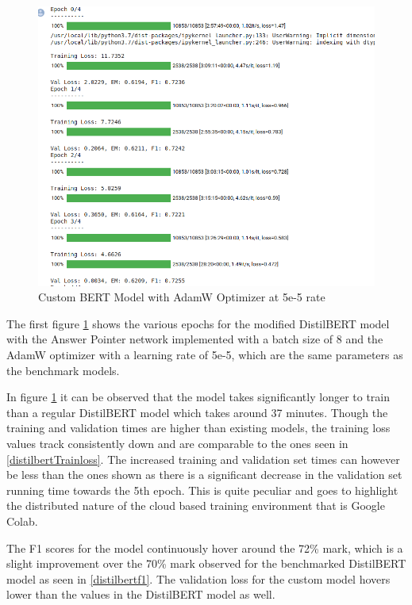 \documentclass[a4paper,12pt]{report}
\begin{document}
	\begin{figure}[!h]
		\centering
		\includegraphics[scale=0.35]{../images/AdamW5e.png}
		\caption{Custom BERT Model with AdamW Optimizer at 5e-5 rate}\label{adam5e}
	\end{figure}

	The first figure \ref{adam5e} shows the various epochs for the modified DistilBERT model with the Answer Pointer network implemented with a batch size of 8 and the AdamW optimizer with a learning rate of 5e-5, which  are the same parameters as the benchmark models.

	In figure \ref{adam5e} it can be observed that the model takes significantly longer to train than a regular DistilBERT model which takes around 37 minutes. Though the training and validation times are higher than existing models, the training loss values track consistently down and are comparable to the ones seen in \ref{distilbertTrainloss}. The increased training and validation set times can however be less than the ones shown as there is a significant decrease in the validation set running time towards the 5th epoch. This is quite peculiar and goes to highlight the distributed nature of the cloud based training environment that is Google Colab.

	The F1 scores for the model continuously hover around the 72\% mark, which is a slight improvement over the 70\% mark observed for the benchmarked DistilBERT model as seen in \ref{distilbertf1}.
	The validation loss for the custom model hovers lower than the values in the DistilBERT model as well.
\end{document}
